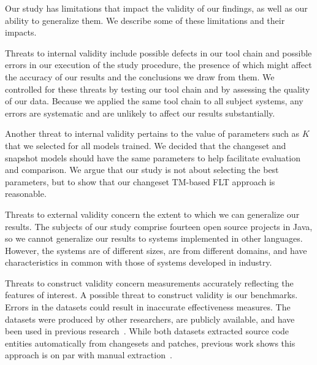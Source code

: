 

Our study has limitations that impact the validity of our findings,
as well as our ability to generalize them.
We describe some of these limitations and their impacts.

Threats to internal validity include possible defects in our tool chain and
possible errors in our execution of the study procedure, the presence of which
might affect the accuracy of our results and the conclusions we draw from them.
We controlled for these threats by testing our tool chain and by assessing the
quality of our data.  Because we applied the same tool chain to all subject
systems, any errors are systematic and are unlikely to affect our results
substantially.

Another threat to internal validity pertains to the value of parameters such as
$K$ that we selected for all models trained.  We decided that the changeset and
snapshot models should have the same parameters to help facilitate evaluation
and comparison.  We argue that our study is not about selecting the best
parameters, but to show that our changeset TM-based FLT approach is reasonable.

Threats to external validity concern the extent to which we can generalize our
results.  The subjects of our study comprise fourteen open source projects in
Java, so we cannot generalize our results to systems implemented in other
languages.  However, the systems are of different sizes, are from different
domains, and have characteristics in common with those of systems developed in
industry.


Threats to construct validity concern measurements accurately reflecting the
features of interest.  A possible threat to construct validity is our
benchmarks.  Errors in the datasets could result in inaccurate effectiveness
measures.  The datasets were produced by other researchers, are publicly
available, and have been used in previous
research~\cite{Dit-etal_2013,Revelle-etal_2010,Moreno-etal_2014}.  While both
datasets extracted source code entities automatically from changesets and
patches, previous work shows this approach is on par with manual
extraction~\cite{Corley-etal_2011}.
